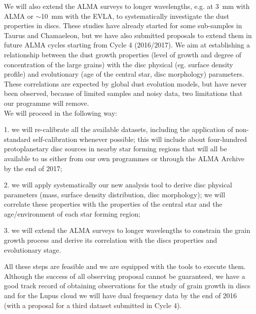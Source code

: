 We will also extend the ALMA surveys to longer wavelengths, e.g. at 3~mm with ALMA or $\sim$10~mm with the EVLA, to systematically investigate the dust properties in discs. These studies have already started for some sub-samples in Taurus and Chamaeleon, but we have also submitted proposals to extend them in future ALMA cycles starting from Cycle 4 (2016/2017). 
We aim at establishing a relationship between the dust growth properties (level of growth and degree of concentration of the large grains) with the disc physical (eg. surface density profile) and evolutionary (age of the central star, disc morphology) parameters. These correlations are expected by global dust evolution models, but have never been observed, because of limited samples and noisy data, two limitations that our programme will remove. 
\\
We will proceed in the following way:

1. we will re-calibrate all the available datasets, including the application of non-standard self-calibration whenever possible; this will include about four-hundred protoplanetary disc sources in nearby star forming regions that will all be available to us either from our own programmes or through the ALMA Archive by the end of 2017;

2. we will apply systematically our new analysis tool to derive disc physical parameters (mass, surface density distribution, disc morphology); we will correlate these properties with the properties of the central star and the age/environment of each star forming region;

3. we will extend the ALMA surveys to longer wavelengths to constrain the grain growth process and derive its correlation with the discs properties and evolutionary stage.

All these steps are feasible and we are equipped with the tools to execute them.
Although the success of all observing proposal cannot be guaranteed, we have a good track record of obtaining observations for the study of grain growth in discs and for the Lupus cloud we will have dual frequency data by the end of 2016 (with a proposal for a third dataset submitted in Cycle 4).

